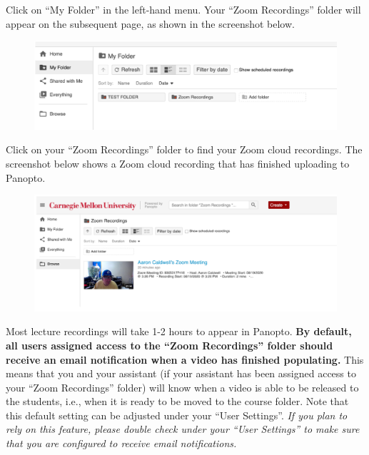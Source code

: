 \begin{gram}
	Click on ``My Folder'' in the left-hand menu. Your ``Zoom Recordings'' folder will appear on the subsequent page, as shown in the screenshot below.

	\begin{figure}[H]
		\centering
		\includegraphics[scale=0.6]{panopto/media/05-my-folder.png}
	\end{figure}
\end{gram}

\begin{gram}
	Click on your ``Zoom Recordings'' folder to find your Zoom cloud recordings. The screenshot below shows a Zoom cloud recording that has finished uploading to Panopto.

	\begin{figure}[H]
		\centering
		\includegraphics[scale=0.7]{panopto/media/06-zoom-recordings.png}
	\end{figure}
\end{gram}

\begin{gram}
	Most lecture recordings will take 1-2 hours to appear in Panopto. \textbf{By default, all users assigned access to the ``Zoom Recordings'' folder should receive an email notification when a video has finished populating.} This means that you and your assistant (if your assistant has been assigned access to your ``Zoom Recordings'' folder) will know when a video is able to be released to the students, i.e., when it is ready to be moved to the course folder. Note that this default setting can be adjusted under your ``User Settings''. \textit{If you plan to rely on this feature, please double check under your ``User Settings'' to make sure that you are configured to receive email notifications.}
\end{gram}

